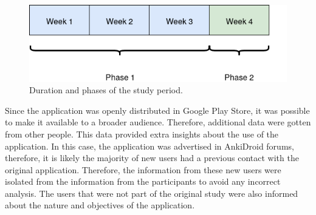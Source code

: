 \begin{figure}[htb]
    \vskip 5mm
        \begin{center}
            \includegraphics[scale=0.7]{./Figures/study_period.png}
            \caption{Duration and phases of the study period.}
            \label{fig:study-period}
        \end{center}
    \vskip -5mm
\end{figure}

Since the application was openly distributed in Google Play Store, it was possible to make it available to a broader audience. Therefore, additional data were gotten from other people. This data provided extra insights about the use of the application. In this case, the application was advertised in AnkiDroid forums, therefore, it is likely the majority of new users had a previous contact with the original application. Therefore, the information from these new users were isolated from the information from the participants to avoid any incorrect analysis. The users that were not part of the original study were also informed about the nature and objectives of the application.
